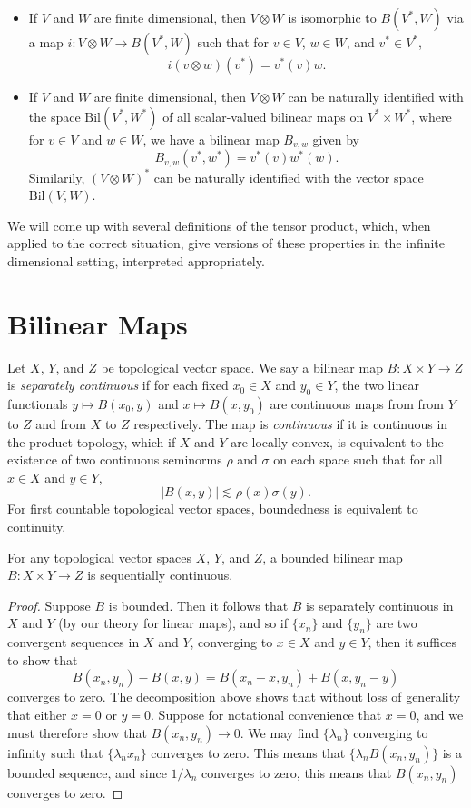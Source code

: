 %
\begin{itemize}
    \item If $V$ and $W$ are finite dimensional, then $V \otimes W$ is isomorphic to $B(V^*,W)$ via a map $i: V \otimes W \to B(V^*,W)$ such that for $v \in V$, $w \in W$, and $v^* \in V^*$,
    \[ i(v \otimes w)(v^*) = v^*(v) w. \]

    \item If $V$ and $W$ are finite dimensional, then $V \otimes W$ can be naturally identified with the space $\text{Bil}(V^*,W^*)$ of all scalar-valued bilinear maps on $V^* \times W^*$, where for $v \in V$ and $w \in W$, we have a bilinear map $B_{v,w}$ given by
    \[ B_{v,w}(v^*,w^*) = v^*(v) w^*(w). \]
    Similarily, $(V \otimes W)^*$ can be naturally identified with the vector space $\text{Bil}(V,W)$.
\end{itemize}
%
We will come up with several definitions of the tensor product, which, when applied to the correct situation, give versions of these properties in the infinite dimensional setting, interpreted appropriately.

\section{Bilinear Maps}

Let $X$, $Y$, and $Z$ be topological vector space. We say a bilinear map $B: X \times Y \to Z$ is \emph{separately continuous} if for each fixed $x_0 \in X$ and $y_0 \in Y$, the two linear functionals $y \mapsto B(x_0,y)$ and $x \mapsto B(x,y_0)$ are continuous maps from from $Y$ to $Z$ and from $X$ to $Z$ respectively. The map is \emph{continuous} if it is continuous in the product topology, which if $X$ and $Y$ are locally convex, is equivalent to the existence of two continuous seminorms $\rho$ and $\sigma$ on each space such that for all $x \in X$ and $y \in Y$,
%
\[ |B(x,y)| \lesssim \rho(x) \sigma(y). \]
%
For first countable topological vector spaces, boundedness is equivalent to continuity.

\begin{theorem}
    For any topological vector spaces $X$, $Y$, and $Z$, a bounded bilinear map $B: X \times Y \to Z$ is sequentially continuous.
\end{theorem}
\begin{proof}
    Suppose $B$ is bounded. Then it follows that $B$ is separately continuous in $X$ and $Y$ (by our theory for linear maps), and so if $\{ x_n \}$ and $\{ y_n \}$ are two convergent sequences in $X$ and $Y$, converging to $x \in X$ and $y \in Y$, then it suffices to show that
    \[ B(x_n,y_n) - B(x,y) = B(x_n - x, y_n) + B(x,y_n - y) \]
    converges to zero. The decomposition above shows that without loss of generality that either $x = 0$ or $y = 0$. Suppose for notational convenience that $x = 0$, and we must therefore show that $B(x_n,y_n) \to 0$. We may find $\{ \lambda_n \}$ converging to infinity such that $\{ \lambda_n x_n \}$ converges to zero. This means that $\{ \lambda_n B(x_n,y_n) \}$ is a bounded sequence, and since $1/\lambda_n$ converges to zero, this means that $B(x_n,y_n)$ converges to zero.
\end{proof}

